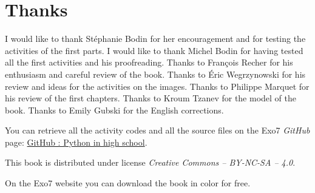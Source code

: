 
\clearemptydoublepage
\pagestyle{empty}\thispagestyle{empty}

\vspace*{\fill}

\section*{Thanks}


I would like to thank Stéphanie Bodin for her encouragement and for testing the activities of the first parts.
I would like to thank Michel Bodin for having tested all the first activities and his proofreading.
Thanks to François Recher for his enthusiasm and careful review of the book. 
Thanks to Éric Wegrzynowski for his review and ideas for the activities on the images. 
Thanks to Philippe Marquet for his review of the first chapters. Thanks to Kroum Tzanev for the model of the book.
Thanks to Emily Gubski for the English corrections.

\bigskip

\begin{center}
You can retrieve all the activity codes \Python{} and all the source files on the Exo7 \emph{GitHub} page:
\href{https://github.com/exo7math/python1-en-exo7}{\og{}GitHub : Python in high school\fg{}}.

\medskip




\end{center}


\vspace*{\fill}

\bigskip 

\begin{center}
\end{center}



\begin{center}
This book is distributed under license \emph{Creative Commons -- BY-NC-SA -- 4.0}.

On the Exo7 website you can download the book in color for free.
\end{center}




\printindex
{}


